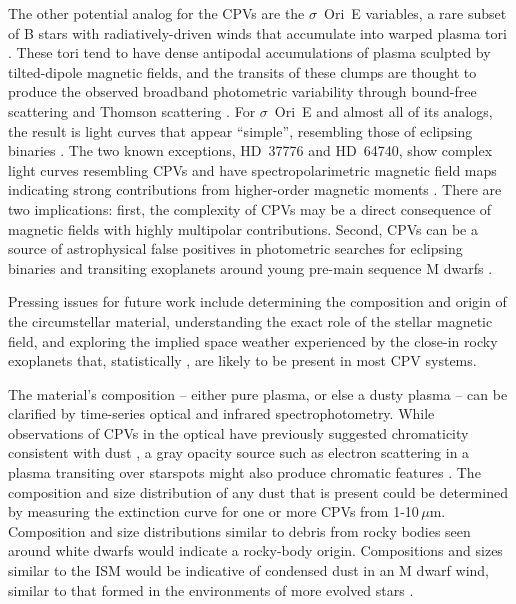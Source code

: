\documentclass{nature3}
\begin{document}
The other potential analog for the CPVs are the $\sigma$~Ori~E
variables, a rare subset of B stars with radiatively-driven winds that
accumulate into warped plasma tori \cite{Townsend2005,Townsend2008}.
These tori tend to have dense antipodal accumulations of plasma sculpted
by tilted-dipole magnetic fields, and the transits of these clumps are
thought to produce the observed broadband photometric variability
through bound-free scattering \cite{Townsend2005} and Thomson scattering
\cite{Berry2022}.  For $\sigma$~Ori~E and almost all of its analogs, the
result is light curves that appear ``simple'', resembling those of
eclipsing binaries \cite{Townsend2008}.  The two known exceptions,
HD~37776 and HD~64740, show complex light curves resembling CPVs
\cite{Mikulasek2020,Bouma2024} and have spectropolarimetric magnetic
field maps indicating strong contributions from higher-order magnetic
moments \cite{Kochukhov2011,Shultz2018}.  There are two implications:
first, the complexity of CPVs may be a direct consequence of magnetic
fields with highly multipolar contributions.  Second, CPVs can be a
source of astrophysical false positives in photometric searches for
eclipsing binaries and transiting exoplanets around young pre-main
sequence M dwarfs \cite{Johns-Krull2016,Bouma2020}.

Pressing issues for future work include determining the composition and
origin of the circumstellar material, understanding the exact role of
the stellar magnetic field, and exploring the implied space weather
experienced by the close-in rocky exoplanets that, statistically
\cite{Dressing2015}, are likely to be present in most CPV systems.

The material's composition -- either pure plasma, or else a dusty plasma
-- can be clarified by time-series optical and infrared
spectrophotometry.  While observations of CPVs in the optical have
previously suggested chromaticity consistent with dust
\cite{Tanimoto2020,Gunther2022,Koen2023}, a gray opacity source such as
electron scattering in a plasma transiting over starspots might also
produce chromatic features \cite{Rackham2018}.  The composition and size
distribution of any dust that is present could be determined
by measuring the extinction curve for one or more CPVs from
1-10\,$\mu$m.  Composition and size distributions similar to debris from
rocky bodies seen around white dwarfs \cite{Reach2009} would indicate a
rocky-body origin.  Compositions and sizes similar to the ISM would be
indicative of condensed dust in an M dwarf wind, similar to that formed
in the environments of more evolved stars \cite{Marigo2008}.
\end{document}
